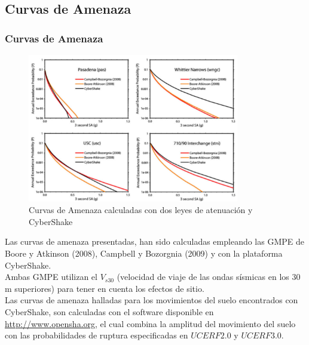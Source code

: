 \documentclass{beamer}
\begin{document}
\subsection{Curvas de Amenaza}
\begin{frame}[allowframebreaks]
\frametitle{Curvas de Amenaza}
%
\justifying
%
\begin{figure}[h]
	\centering
	\includegraphics[height=6.5cm]{img/CurvasAmenaza.pdf}
	\caption{Curvas de Amenaza calculadas con dos leyes de atenuación y CyberShake \cite[figura 7, página 10]{gravesetal}}
	\vspace{-.5 cm}
\end{figure}
%
Las curvas de amenaza presentadas, han sido calculadas empleando las GMPE de Boore y Atkinson (2008), Campbell y Bozorgnia (2009) y con la plataforma CyberShake.\\
%
Ambas GMPE utilizan el $V_{s30}$ (velocidad de viaje de las ondas sísmicas en los $30$m superiores) para tener en cuenta los efectos de sitio.\\
%
Las curvas de amenaza halladas para los movimientos del suelo encontrados con CyberShake, son calculadas con el software disponible en \url{http://www.opensha.org}, el cual combina la amplitud del movimiento del suelo con las probabilidades de ruptura especificadas en $UCERF2.0$ y $UCERF3.0$.
%
%
\end{frame}
%
%
\end{document}
